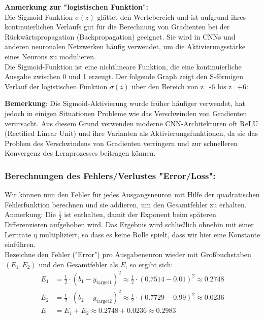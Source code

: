 \documentclass[12pt]{article}
\begin{document}
\textbf{Anmerkung zur "logistischen Funktion":}
\\Die Sigmoid-Funktion $\sigma(z)$ glättet den Wertebereich und ist aufgrund ihres kontinuierlichen Verlaufs gut für die Berechnung von Gradienten bei der Rückwärtspropagation (Backpropagation) geeignet. Sie wird in CNNs und anderen neuronalen Netzwerken häufig verwendet, um die Aktivierungsstärke eines Neurons zu modulieren.\\
Die Sigmoid-Funktion ist eine nichtlineare Funktion, die eine kontinuierliche Ausgabe zwischen 0 und 1 erzeugt. Der folgende Graph zeigt den S-förmigen Verlauf der logistischen Funktion  $\sigma(z)$ über den Bereich von z=-6 bis z=+6:\\
\begin{center}
\end{center}
\textbf{Bemerkung}: Die Sigmoid-Aktivierung wurde früher häufiger verwendet, hat jedoch in einigen Situationen Probleme wie das Verschwinden von Gradienten verursacht. Aus diesem Grund verwenden moderne CNN-Architekturen oft ReLU (Rectified Linear Unit) und ihre Varianten als Aktivierungsfunktionen, da sie das Problem des Verschwindens von Gradienten verringern und zur schnelleren Konvergenz des Lernprozesses beitragen können.

\subsubsection{Berechnungen des Fehlers/Verlustes "Error/Loss":}

Wir können nun den Fehler für jedes Ausgangsneuron mit Hilfe der quadratischen Fehlerfunktion berechnen und sie addieren, um den Gesamtfehler zu erhalten.\\
Anmerkung: Die $\frac{1}{2}$ ist enthalten, damit der Exponent beim späteren Differenzieren aufgehoben wird. Das Ergebnis wird schließlich ohnehin mit einer Lernrate $\eta$ multipliziert, so dass es keine Rolle spielt, dass wir hier eine Konstante einführen. \\ Bezeichne den Fehler ("Error") pro Ausgabeneuron wieder mit Großbuchstaben $(E_1,E_2)$ und den Gesamtfehler als $E$, so ergibt sich: 
\[ 
\begin{aligned}
E_1 &= \frac{1}{2} \cdot (b_1 - y_{\text{target1}})^2 \approx \frac{1}{2} \cdot (0.7514 - 0.01)^2 \approx 0.2748
\\
E_2 &= \frac{1}{2} \cdot (b_2 - y_{\text{target2}})^2 \approx \frac{1}{2} \cdot (0.7729 - 0.99)^2 \approx 0.0236 
\\
E &= E_1 + E_2 \approx 0.2748 + 0.0236 \approx 0.2983
\end{aligned} 
\]
\\
\end{document}
